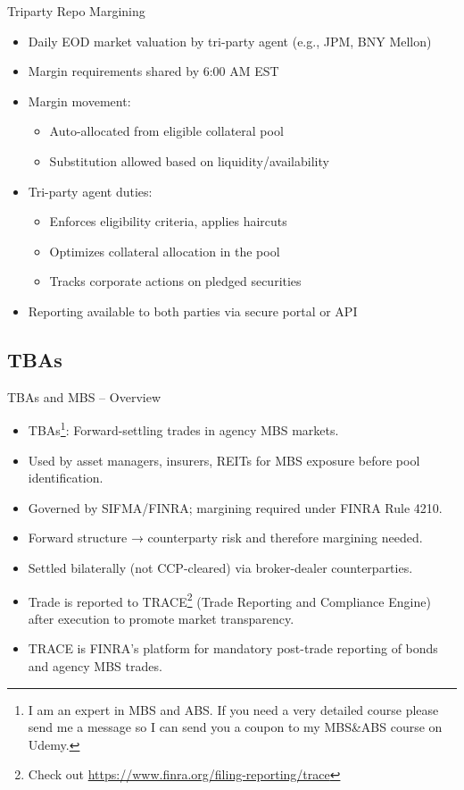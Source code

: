 \documentclass[handout, aspectratio=169]{beamer}
\begin{document}
\begin{frame}{Triparty Repo Margining}
  \begin{itemize}
    \item Daily EOD market valuation by tri-party agent (e.g., JPM, BNY Mellon)
    \item Margin requirements shared by 6:00 AM EST
    \item Margin movement:
    \begin{itemize}
      \item Auto-allocated from eligible collateral pool
      \item Substitution allowed based on liquidity/availability
    \end{itemize}
    \item Tri-party agent duties:
    \begin{itemize}
      \item Enforces eligibility criteria, applies haircuts
      \item Optimizes collateral allocation in the pool
      \item Tracks corporate actions on pledged securities
    \end{itemize}
    \item Reporting available to both parties via secure portal or API
  \end{itemize}
\end{frame}
  
\subsection{TBAs}
\begin{frame}{TBAs and MBS – Overview}
  \begin{itemize}
    \item TBAs\footnote{I am an expert in MBS and ABS. If you need a very detailed course please send me a message so I can send you a coupon to my MBS\&ABS course on Udemy.}: Forward-settling trades in agency MBS markets.
    \item Used by asset managers, insurers, REITs for MBS exposure before pool identification.
    \item Governed by SIFMA/FINRA; margining required under FINRA Rule 4210.
    \item Forward structure → counterparty risk and therefore margining needed.
    \item Settled bilaterally (not CCP-cleared) via broker-dealer counterparties.
    \item Trade is reported to TRACE\footnote{Check out \url{https://www.finra.org/filing-reporting/trace}} (Trade Reporting and Compliance Engine) after execution to promote market transparency.
    \item TRACE is FINRA’s platform for mandatory post-trade reporting of bonds and agency MBS trades.
  \end{itemize}
\end{frame}
\end{document}
